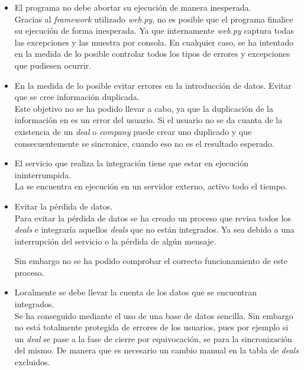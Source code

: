 \begin{itemize}
	\item El programa no debe abortar su ejecución de manera inesperada.\\
	
	Gracias al \textit{framework} utilizado \textit{web.py}, no es posible que el programa finalice su ejecución de forma inesperada. 
	Ya que internamente \textit{web.py} captura todas las excepciones y las muestra por consola. En cualquier caso, se ha intentado en la medida de lo posible controlar todos los tipos de errores y excepciones que pudiesen ocurrir.
	
	\item En la medida de lo posible evitar errores en la introducción de datos. Evitar que se cree información duplicada.\\
	
	Este objetivo no se ha podido llevar a cabo, ya que la duplicación de la información en \hs{} es un error del usuario. Si el usuario no se da cuanta de la existencia de un \textit{deal} o \textit{company} puede crear uno duplicado y que consecuentemente se sincronice, cuando eso no es el resultado esperado.
	
	
	\item El servicio que realiza la integración tiene que estar en ejecución ininterrumpida.\\
	
	La \iface{} se encuentra en ejecución en un servidor externo, activo todo el tiempo.
	
	\item Evitar la pérdida de datos.\\
	
	Para evitar la pérdida de datos se ha creado un proceso que revisa todos los \textit{deals} e integraría aquellos \textit{deals} que no están integrados. 
	Ya sea debido a una interrupción del servicio o la pérdida de algún mensaje.
	
	Sin embargo no se ha podido comprobar el correcto funcionamiento de este proceso.
	\item Localmente se debe llevar la cuenta de los datos que se encuentran integrados.\\
	
	Se ha conseguido mediante el uso de una base de datos sencilla.
	Sin embargo no está totalmente protegida de errores  de los usuarios, pues por ejemplo si un \textit{deal} se pase a la fase de cierre por equivocación, se para la sincronización del mismo.
	De manera que es necesario un cambio manual en la tabla de \textit{deals} excluidos.
	

\end{itemize}
